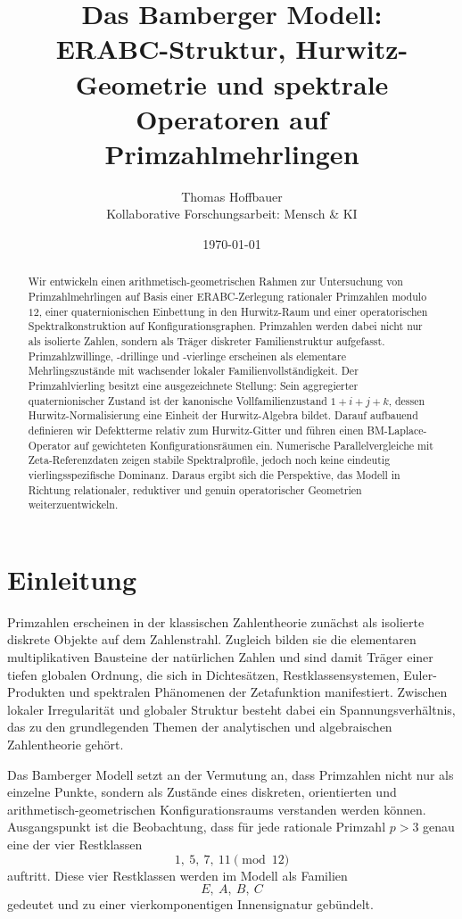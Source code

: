 \documentclass[11pt,a4paper]{article}
\title{Das Bamberger Modell:\\ERABC-Struktur, Hurwitz-Geometrie und spektrale Operatoren auf Primzahlmehrlingen}
\author{Thomas Hoffbauer\\Kollaborative Forschungsarbeit: Mensch \& KI}
\date{\today}
\begin{document}
\maketitle

\begin{abstract}
Wir entwickeln einen arithmetisch-geometrischen Rahmen zur Untersuchung von Primzahlmehrlingen auf Basis einer ERABC-Zerlegung rationaler Primzahlen modulo $12$, einer quaternionischen Einbettung in den Hurwitz-Raum und einer operatorischen Spektralkonstruktion auf Konfigurationsgraphen. Primzahlen werden dabei nicht nur als isolierte Zahlen, sondern als Träger diskreter Familienstruktur aufgefasst. Primzahlzwillinge, -drillinge und -vierlinge erscheinen als elementare Mehrlingszustände mit wachsender lokaler Familienvollständigkeit. Der Primzahlvierling besitzt eine ausgezeichnete Stellung: Sein aggregierter quaternionischer Zustand ist der kanonische Vollfamilienzustand $1+i+j+k$, dessen Hurwitz-Normalisierung eine Einheit der Hurwitz-Algebra bildet. Darauf aufbauend definieren wir Defektterme relativ zum Hurwitz-Gitter und führen einen BM-Laplace-Operator auf gewichteten Konfigurationsräumen ein. Numerische Parallelvergleiche mit Zeta-Referenzdaten zeigen stabile Spektralprofile, jedoch noch keine eindeutig vierlingsspezifische Dominanz. Daraus ergibt sich die Perspektive, das Modell in Richtung relationaler, reduktiver und genuin operatorischer Geometrien weiterzuentwickeln.
\end{abstract}

\tableofcontents

\section{Einleitung}

Primzahlen erscheinen in der klassischen Zahlentheorie zunächst als isolierte diskrete Objekte auf dem Zahlenstrahl. Zugleich bilden sie die elementaren multiplikativen Bausteine der natürlichen Zahlen und sind damit Träger einer tiefen globalen Ordnung, die sich in Dichtesätzen, Restklassensystemen, Euler-Produkten und spektralen Phänomenen der Zetafunktion manifestiert. Zwischen lokaler Irregularität und globaler Struktur besteht dabei ein Spannungsverhältnis, das zu den grundlegenden Themen der analytischen und algebraischen Zahlentheorie gehört.

Das Bamberger Modell setzt an der Vermutung an, dass Primzahlen nicht nur als einzelne Punkte, sondern als Zustände eines diskreten, orientierten und arithmetisch-geometrischen Konfigurationsraums verstanden werden können. Ausgangspunkt ist die Beobachtung, dass für jede rationale Primzahl $p>3$ genau eine der vier Restklassen
\[
1,\ 5,\ 7,\ 11 \pmod{12}
\]
auftritt. Diese vier Restklassen werden im Modell als Familien
\[
E,\ A,\ B,\ C
\]
gedeutet und zu einer vierkomponentigen Innensignatur gebündelt.
\end{document}
